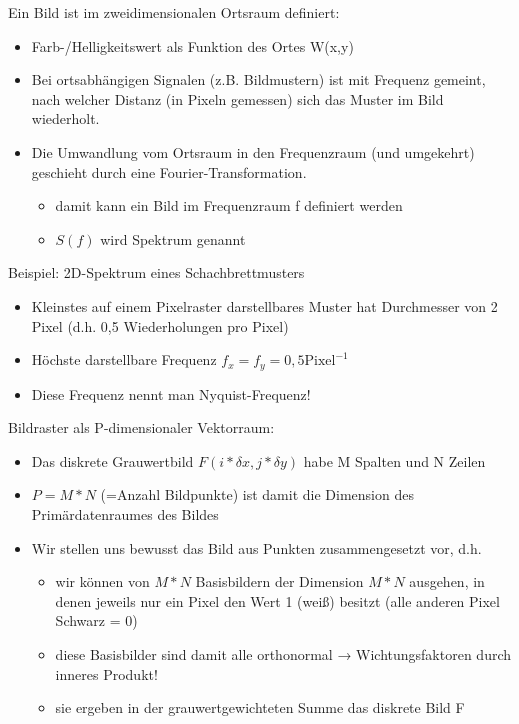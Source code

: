 \documentclass[10pt,landscape]{article}
\begin{document}
\begin{multicols}{3}
Ein Bild ist im zweidimensionalen Ortsraum definiert:
\begin{itemize}
  \item Farb-/Helligkeitswert als Funktion des Ortes W(x,y)
  \item Bei ortsabhängigen Signalen (z.B. Bildmustern) ist mit Frequenz gemeint, nach welcher Distanz (in Pixeln gemessen) sich das Muster im Bild wiederholt.
  \item Die Umwandlung vom Ortsraum in den Frequenzraum (und umgekehrt) geschieht durch eine Fourier-Transformation.
        \begin{itemize}
          \item damit kann ein Bild im Frequenzraum f definiert werden
          \item $S(f)$ wird Spektrum genannt
        \end{itemize}
\end{itemize}


Beispiel: 2D-Spektrum eines Schachbrettmusters
\begin{itemize}
\item Kleinstes auf einem Pixelraster darstellbares Muster hat Durchmesser von 2 Pixel (d.h. 0,5 Wiederholungen pro Pixel)
\item Höchste darstellbare Frequenz $f_x = f_y = 0,5 \text{Pixel}^{-1}$
\item Diese Frequenz nennt man Nyquist-Frequenz!
\end{itemize}

Bildraster als P-dimensionaler Vektorraum:
\begin{itemize}
  \item Das diskrete Grauwertbild $F (i* \delta x, j * \delta y )$ habe M Spalten und N Zeilen
  \item $P = M * N$ (=Anzahl Bildpunkte) ist damit die Dimension des Primärdatenraumes des Bildes
  \item Wir stellen uns bewusst das Bild aus Punkten zusammengesetzt vor, d.h.
        \begin{itemize}
          \item wir können von $M * N$ Basisbildern der Dimension $M * N$ ausgehen, in denen jeweils nur ein Pixel den Wert 1 (weiß) besitzt (alle anderen Pixel Schwarz = 0)
          \item diese Basisbilder sind damit alle orthonormal → Wichtungsfaktoren durch inneres Produkt!
          \item sie ergeben in der grauwertgewichteten Summe das diskrete Bild F
        \end{itemize}
\end{itemize}


\end{multicols}
\end{document}
